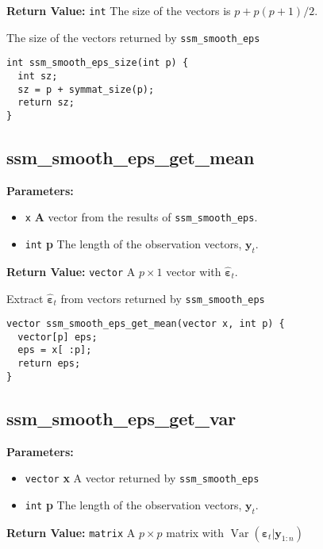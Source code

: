\documentclass[]{book}
\providecommand{\tightlist}{%
  \setlength{\itemsep}{0pt}\setlength{\parskip}{0pt}}
\DeclareMathOperator{\Var}{Var}
\renewcommand{\vec}[1]{\boldsymbol{#1}}
\begin{document}
\textbf{Return Value:} \texttt{int} The size of the vectors is
\(p + p (p + 1) / 2\).

The size of the vectors returned by \texttt{ssm\_smooth\_eps}

\begin{verbatim}
int ssm_smooth_eps_size(int p) {
  int sz;
  sz = p + symmat_size(p);
  return sz;
}
\end{verbatim}

\subsection{ssm\_smooth\_eps\_get\_mean}\label{ssmux5fsmoothux5fepsux5fgetux5fmean}

\textbf{Parameters:}

\begin{itemize}
\tightlist
\item
  \texttt{x} \textbf{A} vector from the results of
  \texttt{ssm\_smooth\_eps}.
\item
  \texttt{int} \textbf{p} The length of the observation vectors,
  \(\vec{y}_t\).
\end{itemize}

\textbf{Return Value:} \texttt{vector} A \(p \times 1\) vector with
\(\hat{\vec{\varepsilon}}_t\).

Extract \(\hat{\vec{\varepsilon}}_t\) from vectors returned by
\texttt{ssm\_smooth\_eps}

\begin{verbatim}
vector ssm_smooth_eps_get_mean(vector x, int p) {
  vector[p] eps;
  eps = x[ :p];
  return eps;
}
\end{verbatim}

\subsection{ssm\_smooth\_eps\_get\_var}\label{ssmux5fsmoothux5fepsux5fgetux5fvar}

\textbf{Parameters:}

\begin{itemize}
\tightlist
\item
  \texttt{vector} \textbf{x} A vector returned by
  \texttt{ssm\_smooth\_eps}
\item
  \texttt{int} \textbf{p} The length of the observation vectors,
  \(\vec{y}_t\).
\end{itemize}

\textbf{Return Value:} \texttt{matrix} A \(p \times p\) matrix with
\(\Var(\vec{\varepsilon}_t | \vec{y}_{1:n})\)
\end{document}
